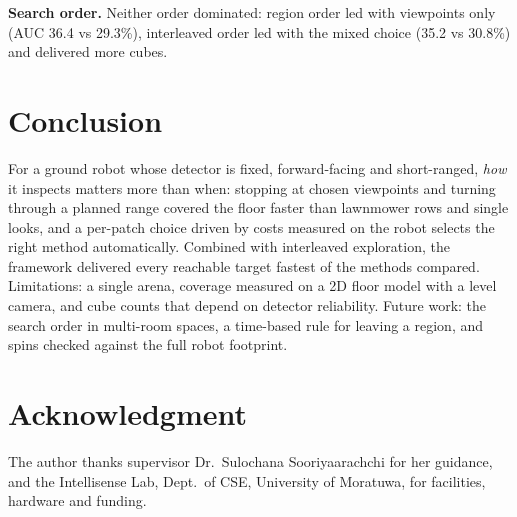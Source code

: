 \documentclass[conference,a4paper,10pt]{IEEEtran}
\begin{document}
\textbf{Search order.} Neither order dominated: region order led with
viewpoints only (AUC 36.4 vs 29.3\%), interleaved order led with the mixed
choice (35.2 vs 30.8\%) and delivered more cubes.

\section{Conclusion}
For a ground robot whose detector is fixed, forward-facing and short-ranged,
\emph{how} it inspects matters more than when: stopping at chosen viewpoints
and turning through a planned range covered the floor faster than lawnmower rows
and single looks, and a per-patch choice driven by costs measured on the robot
selects the right method automatically. Combined with interleaved exploration,
the framework delivered every reachable target fastest of the methods compared.
Limitations: a single arena, coverage measured on a 2D floor model with a level
camera, and cube counts that depend on detector reliability. Future work: the
search order in multi-room spaces, a time-based rule for leaving a region, and
spins checked against the full robot footprint.

\section*{Acknowledgment}
The author thanks supervisor Dr.~Sulochana Sooriyaarachchi for her guidance,
and the Intellisense Lab, Dept.\ of CSE, University of Moratuwa, for
facilities, hardware and funding.
\end{document}
